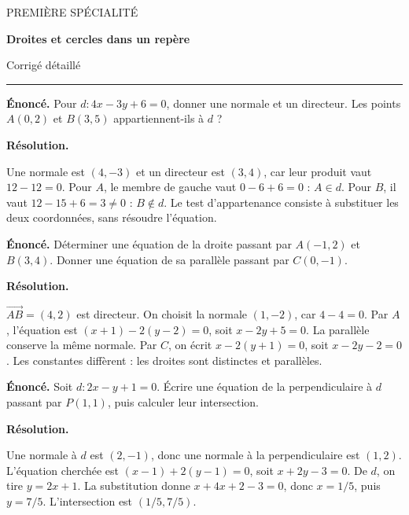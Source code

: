 \documentclass[11pt,a4paper]{article}
\begin{document}
{\small\color{Blue}PREMIÈRE SPÉCIALITÉ}\par{\LARGE\bfseries Droites et cercles dans un repère}\par{\large Corrigé détaillé}\par\vspace{0.2cm}\hrule\vspace{0.4cm}
\par\noindent\begin{minipage}{\linewidth}
{\small\color{Muted}\textbf{Énoncé.} Pour $d:4x-3y+6=0$, donner une normale et un directeur. Les points $A(0,2)$ et $B(3,5)$ appartiennent-ils à $d$ ?}
\par\medskip
\textbf{Résolution.}\par
Une normale est $(4,-3)$ et un directeur est $(3,4)$, car leur produit vaut $12-12=0$. Pour $A$, le membre de gauche vaut $0-6+6=0$ : $A\in d$. Pour $B$, il vaut $12-15+6=3\ne0$ : $B\notin d$. Le test d’appartenance consiste à substituer les deux coordonnées, sans résoudre l’équation.
\end{minipage}\par
\par\noindent\begin{minipage}{\linewidth}
{\small\color{Muted}\textbf{Énoncé.} Déterminer une équation de la droite passant par $A(-1,2)$ et $B(3,4)$. Donner une équation de sa parallèle passant par $C(0,-1)$.}
\par\medskip
\textbf{Résolution.}\par
$\overrightarrow{AB}=(4,2)$ est directeur. On choisit la normale $(1,-2)$, car $4-4=0$. Par $A$, l’équation est $(x+1)-2(y-2)=0$, soit $x-2y+5=0$. La parallèle conserve la même normale. Par $C$, on écrit $x-2(y+1)=0$, soit $x-2y-2=0$. Les constantes diffèrent : les droites sont distinctes et parallèles.
\end{minipage}\par
\par\noindent\begin{minipage}{\linewidth}
{\small\color{Muted}\textbf{Énoncé.} Soit $d:2x-y+1=0$. Écrire une équation de la perpendiculaire à $d$ passant par $P(1,1)$, puis calculer leur intersection.}
\par\medskip
\textbf{Résolution.}\par
Une normale à $d$ est $(2,-1)$, donc une normale à la perpendiculaire est $(1,2)$. L’équation cherchée est $(x-1)+2(y-1)=0$, soit $x+2y-3=0$. De $d$, on tire $y=2x+1$. La substitution donne $x+4x+2-3=0$, donc $x=1/5$, puis $y=7/5$. L’intersection est $(1/5,7/5)$.
\end{minipage}\par
\end{document}
